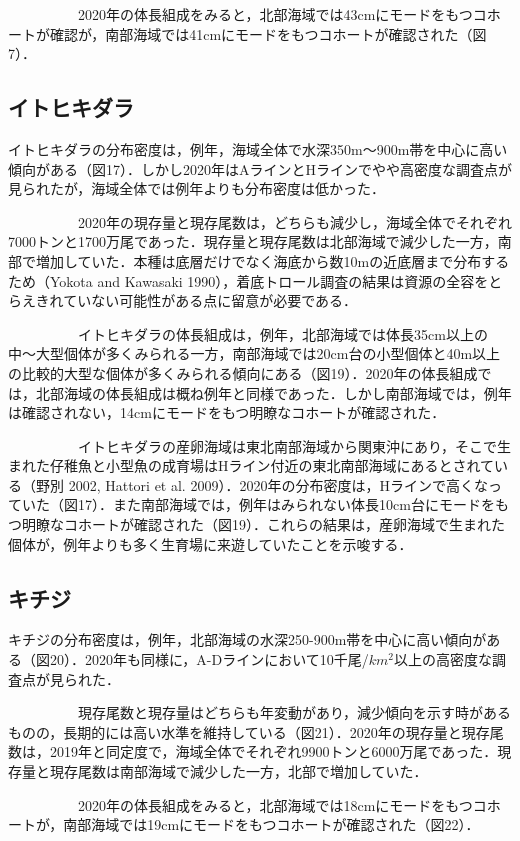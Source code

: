 \documentclass[11pt]{article} %
\begin{document}
\begin{linenumbers}
\ \ \ \ \ \ \ \ \ \ 
2020年の体長組成をみると，北部海域では43cmにモードをもつコホートが確認が，南部海域では41cmにモードをもつコホートが確認された（図7）．


\subsection{イトヒキダラ}
イトヒキダラの分布密度は，例年，海域全体で水深350m～900m帯を中心に高い傾向がある（図17）．しかし2020年はAラインとHラインでやや高密度な調査点が見られたが，海域全体では例年よりも分布密度は低かった．

\ \ \ \ \ \ \ \ \ \ 
2020年の現存量と現存尾数は，どちらも減少し，海域全体でそれぞれ7000トンと1700万尾であった．現存量と現存尾数は北部海域で減少した一方，南部で増加していた．本種は底層だけでなく海底から数10mの近底層まで分布するため（Yokota and Kawasaki 1990），着底トロール調査の結果は資源の全容をとらえきれていない可能性がある点に留意が必要である．

\ \ \ \ \ \ \ \ \ \ 
イトヒキダラの体長組成は，例年，北部海域では体長35cm以上の中〜大型個体が多くみられる一方，南部海域では20cm台の小型個体と40m以上の比較的大型な個体が多くみられる傾向にある（図19）．2020年の体長組成では，北部海域の体長組成は概ね例年と同様であった．しかし南部海域では，例年は確認されない，14cmにモードをもつ明瞭なコホートが確認された．

\ \ \ \ \ \ \ \ \ \ 
イトヒキダラの産卵海域は東北南部海域から関東沖にあり，そこで生まれた仔稚魚と小型魚の成育場はHライン付近の東北南部海域にあるとされている（野別 2002, Hattori et al. 2009）．2020年の分布密度は，Hラインで高くなっていた（図17）．また南部海域では，例年はみられない体長10cm台にモードをもつ明瞭なコホートが確認された（図19）．これらの結果は，産卵海域で生まれた個体が，例年よりも多く生育場に来遊していたことを示唆する．


\subsection{キチジ}
キチジの分布密度は，例年，北部海域の水深250-900m帯を中心に高い傾向がある（図20）．2020年も同様に，A-Dラインにおいて10千尾/$km^2$以上の高密度な調査点が見られた．

\ \ \ \ \ \ \ \ \ \ 
現存尾数と現存量はどちらも年変動があり，減少傾向を示す時があるものの，長期的には高い水準を維持している（図21）．2020年の現存量と現存尾数は，2019年と同定度で，海域全体でそれぞれ9900トンと6000万尾であった．現存量と現存尾数は南部海域で減少した一方，北部で増加していた．

\ \ \ \ \ \ \ \ \ \ 
2020年の体長組成をみると，北部海域では18cmにモードをもつコホートが，南部海域では19cmにモードをもつコホートが確認された（図22）．



\end{linenumbers}
\end{document}
